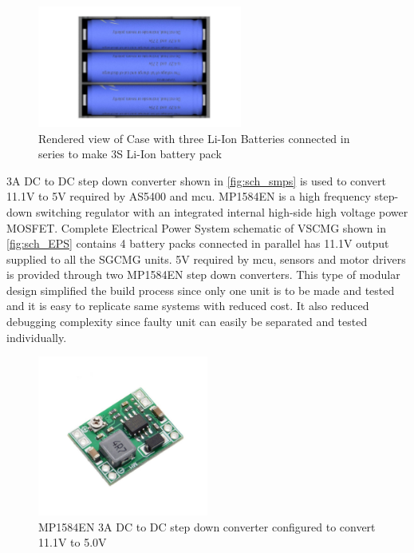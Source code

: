 \begin{figure}[ht]
    \centering
    \includegraphics[width=0.6\textwidth]{figures/Assembly/BAT18650Case.pdf}
    \caption{Rendered view of Case with three Li-Ion Batteries connected in series to make 3S Li-Ion battery pack}
    \label{fig:BAT18650}
\end{figure}

\noindent 3A DC to DC step down converter shown in \autoref{fig:sch_smps} is used to convert 11.1V to 5V required by AS5400 and \acrshort{mcu}. MP1584EN is a high frequency step-down switching regulator with an integrated internal high-side high voltage power MOSFET. Complete Electrical Power System schematic of VSCMG shown in \autoref{fig:sch_EPS} contains 4 battery packs connected in parallel has 11.1V output supplied to all the SGCMG units. 5V required by \acrshort{mcu}, sensors and motor drivers is provided through two MP1584EN step down converters. This type of modular design simplified the build process since only one unit is to be made and tested and it is easy to replicate same systems with reduced cost. It also reduced debugging complexity since faulty unit can easily be separated and tested individually.

\begin{figure}[ht]
    \centering
    \includegraphics[width=0.5\textwidth]{figures/Assembly/buckConvertor.pdf}
    \caption{MP1584EN 3A DC to DC step down converter configured to convert 11.1V to 5.0V}
    \label{fig:sch_smps}
\end{figure}

